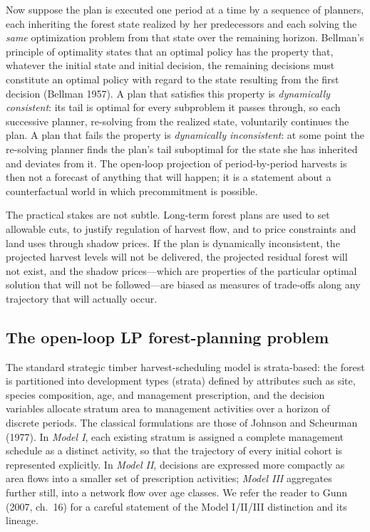 \documentclass[12pt]{article}
\begin{document}
Now suppose the plan is executed one period at a time by a sequence of planners, each inheriting the forest state realized by her predecessors and each solving the \emph{same} optimization problem from that state over the remaining horizon. Bellman's principle of optimality states that an optimal policy has the property that, whatever the initial state and initial decision, the remaining decisions must constitute an optimal policy with regard to the state resulting from the first decision (Bellman 1957). A plan that satisfies this property is \emph{dynamically consistent}: its tail is optimal for every subproblem it passes through, so each successive planner, re-solving from the realized state, voluntarily continues the plan. A plan that fails the property is \emph{dynamically inconsistent}: at some point the re-solving planner finds the plan's tail suboptimal for the state she has inherited and deviates from it. The open-loop projection of period-by-period harvests is then not a forecast of anything that will happen; it is a statement about a counterfactual world in which precommitment is possible.

The practical stakes are not subtle. Long-term forest plans are used to set allowable cuts, to justify regulation of harvest flow, and to price constraints and land uses through shadow prices. If the plan is dynamically inconsistent, the projected harvest levels will not be delivered, the projected residual forest will not exist, and the shadow prices---which are properties of the particular optimal solution that will not be followed---are biased as measures of trade-offs along any trajectory that will actually occur.

\hypertarget{the-open-loop-lp-forest-planning-problem}{%
\subsection{The open-loop LP forest-planning problem}\label{the-open-loop-lp-forest-planning-problem}}

The standard strategic timber harvest-scheduling model is strata-based: the forest is partitioned into development types (strata) defined by attributes such as site, species composition, age, and management prescription, and the decision variables allocate stratum area to management activities over a horizon of discrete periods. The classical formulations are those of Johnson and Scheurman (1977). In \emph{Model I}, each existing stratum is assigned a complete management schedule as a distinct activity, so that the trajectory of every initial cohort is represented explicitly. In \emph{Model II}, decisions are expressed more compactly as area flows into a smaller set of prescription activities; \emph{Model III} aggregates further still, into a network flow over age classes. We refer the reader to Gunn (2007, ch.~16) for a careful statement of the Model I/II/III distinction and its lineage.
\end{document}
